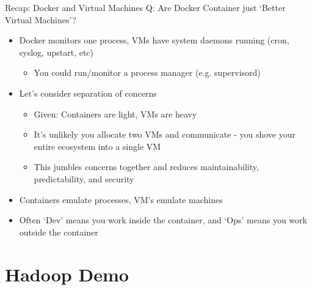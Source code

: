 \documentclass[xcolor=dvipsnames]{beamer}
\newcommand{\cpause}{}
\begin{document}
\begin{frame}{Recap: Docker and Virtual Machines}
  Q: Are Docker Container just `Better Virtual Machines'?
  \cpause

  \begin{itemize}
  \item Docker monitors one process, VMs have system daemons running (cron, syslog, upstart, etc) 
    \cpause
    \begin{itemize}
    \item You could run/monitor a process manager (e.g. supervisord)
    \end{itemize}
    \cpause
  \item Let's consider separation of concerns \cpause
    \begin{itemize}
    \item Given: Containers are light, VMs are heavy \cpause
    \item It's unlikely you allocate two VMs and communicate - you shove your entire ecosystem into a single VM \cpause
    \item This jumbles concerns together and reduces maintainability, predictability, and security \cpause
    \end{itemize}
  \item Containers emulate processes, VM's emulate machines \cpause
  \item Often `Dev' means you work inside the container, and `Ops' means you work outside the container
  \end{itemize}
\end{frame}

\section{Hadoop Demo}
\end{document}
